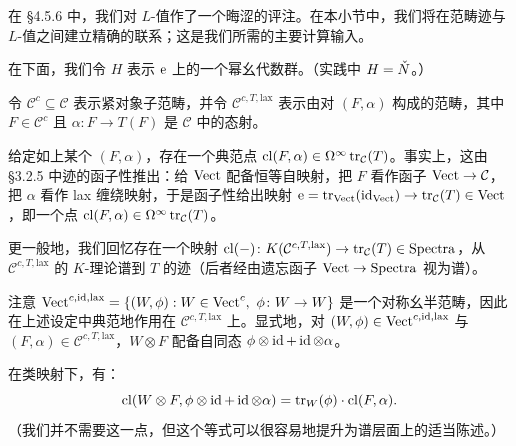 在 §4.5.6 中，我们对 $L$-值作了一个晦涩的评注。在本小节中，我们将在范畴迹与 $L$-值之间建立精确的联系；这是我们所需的主要计算输入。

在下面，我们令 $H$ 表示 $\mathrm{e}$ 上的一个幂幺代数群。（实践中 $H=\check{N}$。）


令 $\mathcal{C}^c\subseteq\mathcal{C}$ 表示紧对象子范畴，并令 $\mathcal{C}^{c,T,\mathrm{lax}}$ 表示由对 $(F,\alpha)$ 构成的范畴，其中 $F\in\mathcal{C}^c$ 且 $\alpha\colon F\to T(F)$ 是 $\mathcal{C}$ 中的态射。

给定如上某个 $(F,\alpha)$，存在一个典范点 $\operatorname{cl}(F,\alpha)\in\Omega^\infty\operatorname{tr}_{\mathcal{C}}(T)$。事实上，这由 §3.2.5 中迹的函子性推出：给 $\mathrm{Vect}$ 配备恒等自映射，把 $F$ 看作函子 $\mathrm{Vect}\to\mathcal{C}$，把 $\alpha$ 看作 lax 缠绕映射，于是函子性给出映射 $\mathrm{e}=\operatorname{tr}_{\mathrm{Vect}}(\operatorname{id}_{\mathrm{Vect}})\to\operatorname{tr}_{\mathcal{C}}(T)\in\mathrm{Vect}$，即一个点 $\operatorname{cl}(F,\alpha)\in\Omega^\infty\operatorname{tr}_{\mathcal{C}}(T)$。

更一般地，我们回忆存在一个映射 $\operatorname{cl}(-)\colon K(\mathcal{C}^{c,T,\mathrm{lax}})\to\operatorname{tr}_{\mathcal{C}}(T)\in\mathrm{Spectra}$，从 $\mathcal{C}^{c,T,\mathrm{lax}}$ 的 $K$-理论谱到 $T$ 的迹（后者经由遗忘函子 $\mathrm{Vect}\to\mathrm{Spectra}$ 视为谱）。

\begin{notation}
注意 $\Vect^{c,\id,\mathrm{lax}}=\{(W,\phi):W\in\Vect^c,\ \phi\colon W\to W\}$ 是一个对称幺半范畴，因此在上述设定中典范地作用在 $\mathcal{C}^{c,T,\mathrm{lax}}$ 上。显式地，对 $(W,\phi)\in\mathrm{Vect}^{c,\operatorname{id},\mathrm{lax}}$ 与 $(F,\alpha)\in\mathcal{C}^{c,T,\mathrm{lax}}$，$W\otimes F$ 配备自同态 $\phi\otimes\operatorname{id}+\operatorname{id}\otimes\alpha$。

在类映射下，有：
\begin{equation}
  \operatorname{cl}(W\otimes F,\phi\otimes\operatorname{id}+\operatorname{id}\otimes\alpha)=\operatorname{tr}_W(\phi)\cdot\operatorname{cl}(F,\alpha).
\end{equation}
（我们并不需要这一点，但这个等式可以很容易地提升为谱层面上的适当陈述。）
\end{notation}


